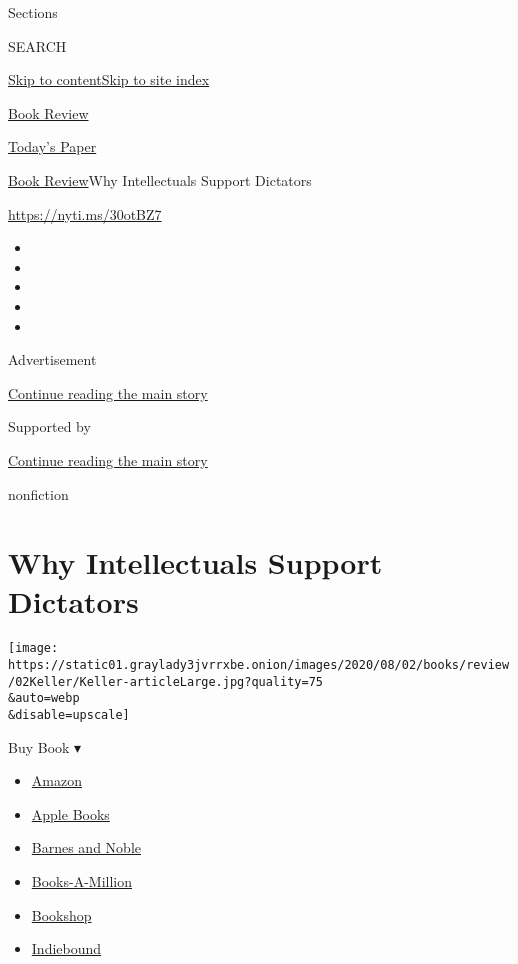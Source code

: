 Sections

SEARCH

\protect\hyperlink{site-content}{Skip to
content}\protect\hyperlink{site-index}{Skip to site index}

\href{https://www.nytimes3xbfgragh.onion/section/books/review}{Book
Review}

\href{https://myaccount.nytimes3xbfgragh.onion/auth/login?response_type=cookie\&client_id=vi}{}

\href{https://www.nytimes3xbfgragh.onion/section/todayspaper}{Today's
Paper}

\href{/section/books/review}{Book Review}\textbar{}Why Intellectuals
Support Dictators

\url{https://nyti.ms/30otBZ7}

\begin{itemize}
\item
\item
\item
\item
\item
\end{itemize}

Advertisement

\protect\hyperlink{after-top}{Continue reading the main story}

Supported by

\protect\hyperlink{after-sponsor}{Continue reading the main story}

nonfiction

\hypertarget{why-intellectuals-support-dictators}{%
\section{Why Intellectuals Support
Dictators}\label{why-intellectuals-support-dictators}}

\texttt{[image: https://static01.graylady3jvrrxbe.onion/images/2020/08/02/books/review/02Keller/Keller-articleLarge.jpg?quality=75\\\&auto=webp\\\&disable=upscale]}

Buy Book ▾

\begin{itemize}
\tightlist
\item
  \href{https://www.amazon.com/gp/search?index=books\&tag=NYTBSREV-20\&field-keywords=Twilight+of+Democracy+Anne+Applebaum}{Amazon}
\item
  \href{https://du-gae-books-dot-nyt-du-prd.appspot.com/buy?title=Twilight+of+Democracy\&author=Anne+Applebaum}{Apple
  Books}
\item
  \href{https://www.anrdoezrs.net/click-7990613-11819508?url=https\%3A\%2F\%2Fwww.barnesandnoble.com\%2Fw\%2F\%3Fean\%3D9780385545808}{Barnes
  and Noble}
\item
  \href{https://www.anrdoezrs.net/click-7990613-35140?url=https\%3A\%2F\%2Fwww.booksamillion.com\%2Fp\%2FTwilight\%2Bof\%2BDemocracy\%2FAnne\%2BApplebaum\%2F9780385545808}{Books-A-Million}
\item
  \href{https://bookshop.org/a/3546/9780385545808}{Bookshop}
\item
  \href{https://www.indiebound.org/book/9780385545808?aff=NYT}{Indiebound}
\end{itemize}

